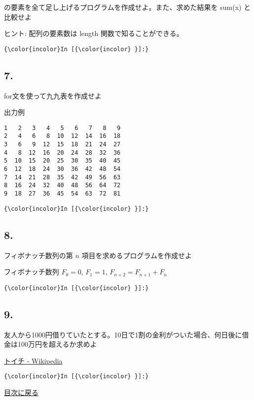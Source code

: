 \documentclass[a4paper,dvipdfmx,uplatex]{jsarticle}
\begin{document}
の要素を全て足し上げるプログラムを作成せよ。また、求めた結果を sum(x)
と比較せよ

ヒント: 配列の要素数は length 関数で知ることができる。

    \begin{Verbatim}[commandchars=\\\{\}]
{\color{incolor}In [{\color{incolor} }]:} 
\end{Verbatim}

    \subsection{7.}\label{section}

for文を使って九九表を作成せよ

出力例

\begin{verbatim}
1   2   3   4   5   6   7   8   9 
2   4   6   8  10  12  14  16  18 
3   6   9  12  15  18  21  24  27 
4   8  12  16  20  24  28  32  36 
5  10  15  20  25  30  35  40  45 
6  12  18  24  30  36  42  48  54 
7  14  21  28  35  42  49  56  63 
8  16  24  32  40  48  56  64  72 
9  18  27  36  45  54  63  72  81 
\end{verbatim}

    \begin{Verbatim}[commandchars=\\\{\}]
{\color{incolor}In [{\color{incolor} }]:} 
\end{Verbatim}

    \subsection{8.}\label{section}

フィボナッチ数列の第 \(n\) 項目を求めるプログラムを作成せよ

フィボナッチ数列 \(F_0 = 0\), \(F_1 = 1\), \(F_{n+2} = F_{n+1} + F_{n}\)

    \begin{Verbatim}[commandchars=\\\{\}]
{\color{incolor}In [{\color{incolor} }]:} 
\end{Verbatim}

    \subsection{9.}\label{section}

友人から1000円借りていたとする。10日で1割の金利がついた場合、何日後に借金は100万円を超えるか求めよ

\href{https://ja.wikipedia.org/wiki/\%E3\%83\%88\%E3\%82\%A4\%E3\%83\%81}{トイチ
- Wikipedia}

    \begin{Verbatim}[commandchars=\\\{\}]
{\color{incolor}In [{\color{incolor} }]:} 
\end{Verbatim}

    \protect\hyperlink{ux76eeux6b21}{目次に戻る}


    
    
    
    
\end{document}
